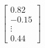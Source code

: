 \documentclass[preview]{standalone}
\begin{document}
\begin{align*}
\begin{bmatrix} 0.82 \\ -0.15 \\ \vdots \\ 0.44 \end{bmatrix}
\end{align*}
\end{document}
